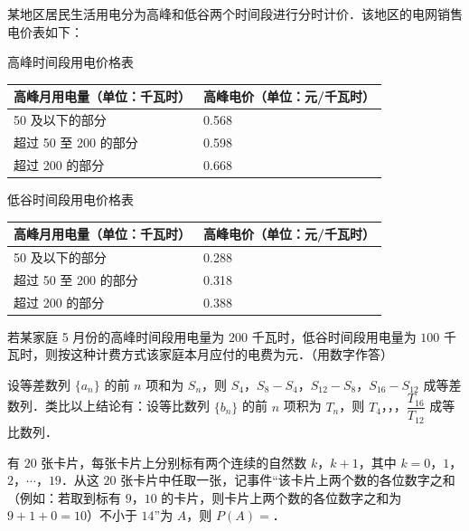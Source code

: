 \begin{question}
某地区居民生活用电分为高峰和低谷两个时间段进行分时计价．该地区的电网销售电价表如下：

高峰时间段用电价格表

\begin{center}
\begin{tabular}{ll}
\toprule
高峰月用电量（单位：千瓦时） & 高峰电价（单位：元/千瓦时） \\
\midrule
50 及以下的部分 & 0.568 \\
超过 50 至 200 的部分 & 0.598 \\
超过 200 的部分 & 0.668 \\
\bottomrule
\end{tabular}
\end{center}

低谷时间段用电价格表

\begin{center}
\begin{tabular}{ll}
\toprule
高峰月用电量（单位：千瓦时） & 高峰电价（单位：元/千瓦时） \\
\midrule
50 及以下的部分 & 0.288 \\
超过 50 至 200 的部分 & 0.318 \\
超过 200 的部分 & 0.388 \\
\bottomrule
\end{tabular}
\end{center}

若某家庭 5 月份的高峰时间段用电量为 $200$ 千瓦时，低谷时间段用电量为 $100$ 千瓦时，则按这种计费方式该家庭本月应付的电费为\gkblank{}元．（用数字作答）

\end{question}
\endgroup
\begin{question}
设等差数列 $\{a_n\}$ 的前 $n$ 项和为 $S_n$，则 $S_4$，$S_8-S_4$，$S_{12}-S_8$，$S_{16}-S_{12}$ 成等差数列．类比以上结论有：设等比数列 $\{b_n\}$ 的前 $n$ 项积为 $T_n$，则 $T_4$，\gkblank{}，\gkblank{}，$\dfrac{T_{16}}{T_{12}}$ 成等比数列．

\end{question}
\begin{question}
有 $20$ 张卡片，每张卡片上分别标有两个连续的自然数 $k$，$k+1$，其中 $k=0$，$1$，$2$，$\cdots$，$19$．从这 $20$ 张卡片中任取一张，记事件“该卡片上两个数的各位数字之和（例如：若取到标有 $9$，$10$ 的卡片，则卡片上两个数的各位数字之和为 $9+1+0=10$）不小于 $14$”为 $A$，则 $P(A)=$\gkblank{}．

\end{question}

